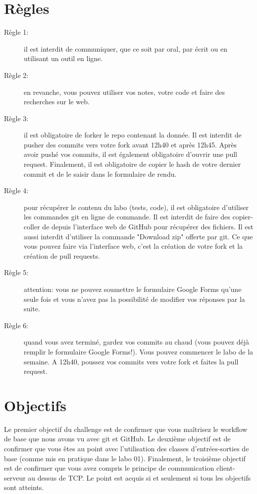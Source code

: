 \documentclass[a4paper, french, 10pt]{article} %
\begin{document}
\section{Règles}

\begin{framed}
\begin{description}
\item[Règle 1:] il est interdit de communiquer, que ce soit par oral, par écrit ou en utilisant un outil en ligne.
\item[Règle 2:] en revanche, vous pouvez utiliser vos notes, votre code et faire des recherches sur le web.
\item[Règle 3:] il est obligatoire de forker le repo contenant la donnée. Il est interdit de pusher des commits vers votre fork avant 12h40 et après 12h45. Après avoir pushé vos commits, il est également obligatoire d'ouvrir une pull request. Finalement, il est obligatoire de copier le hash de votre dernier commit et de le saisir dans le formulaire de rendu.
\item[Règle 4:] pour récupérer le contenu du labo (tests, code), il est obligatoire d'utiliser les commandes git en ligne de commande. Il est interdit de faire des copier-coller de depuis l'interface web de GitHub pour récupérer des fichiers. Il est aussi interdit d'utiliser la commande "Download zip" offerte par git. Ce que vous pouvez faire via l'interface web, c'est la création de votre fork et la création de pull requests.
\item[Règle 5:] attention: vous ne pouvez soumettre le formulaire Google Forms qu'une seule fois et vous n'avez pas la possibilité de modifier vos réponses par la suite.
\item[Règle 6:] quand vous avez terminé, gardez vos commits au chaud (vous pouvez déjà remplir le formulaire Google Forms!). Vous pouvez commencer le labo de la semaine. A 12h40, poussez vos commits vers votre fork et faites la pull request. 
\end{description}
\end{framed}

\section{Objectifs}

Le premier objectif du challenge est de confirmer que vous maîtrisez le workflow de base que nous avons vu avec git et GitHub. Le deuxième objectif est de confirmer que vous êtes au point avec l'utilisation des classes d'entrées-sorties de base (comme mis en pratique dans le labo 01). Finalement, le troisième objectif est de confirmer que vous avez compris le principe de communication client-serveur au dessus de TCP. Le point est acquis si et seulement si tous les objectifs sont atteints.
\end{document}
